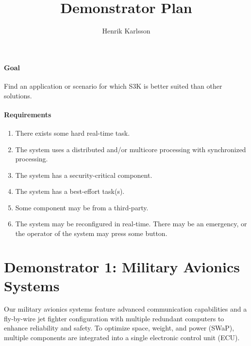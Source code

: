 \documentclass[a4paper,11pt]{article}
\title{Demonstrator Plan}
\author{Henrik Karlsson}
\begin{document}
	\maketitle

	\paragraph{Goal} Find an application or scenario for which S3K is better suited than other solutions.

	\paragraph{Requirements}
	\begin{enumerate}[label=R\arabic*)]
		\item There exists some hard real-time task.
		\item The system uses a distributed and/or multicore processing with synchronized processing.
		\item The system has a security-critical component.
		\item The system has a best-effort task(s).
		\item Some component may be from a third-party.
		\item The system may be reconfigured in real-time. There may be an emergency, or the operator of the system may press some button.
	\end{enumerate}

	\newpage
	\section*{Demonstrator 1: Military Avionics Systems}
	Our military avionics systems feature advanced communication capabilities and a fly-by-wire jet fighter configuration with multiple redundant computers to enhance reliability and safety. 
	To optimize space, weight, and power (SWaP), multiple components are integrated into a single electronic control unit (ECU).
\end{document}
